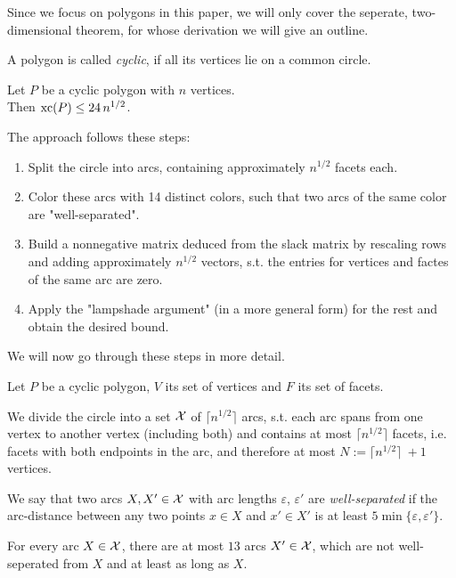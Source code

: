Since we focus on polygons in this paper, we will only cover the seperate, two-dimensional theorem, for whose derivation we will give an outline.

\begin{definition}
  A polygon is called \emph{cyclic}, if all its vertices lie on a common circle.
\end{definition}

\begin{theorem}
  Let $P$ be a cyclic polygon with $n$ vertices.\\
  Then $\operatorname{xc}(P) \leq 24\,n^{1/2}$.
\end{theorem}

The approach follows these steps:

\begin{enumerate}
  \item Split the circle into arcs, containing approximately $n^{1/2}$ facets each.
  \item Color these arcs with 14 distinct colors, such that two arcs of the same color are "well-separated".
  \item Build a nonnegative matrix deduced from the slack matrix by rescaling rows and adding approximately $n^{1/2}$ vectors, s.t. the entries for vertices and factes of the same arc are zero.
  \item Apply the "lampshade argument" (in a more general form) for the rest and obtain the desired bound.
\end{enumerate}

We will now go through these steps in more detail.

Let $P$ be a cyclic polygon, $V$ its set of vertices and $F$ its set of facets.

We divide the circle into a set $\mathcal{X}$ of $\lceil n^{1/2} \rceil$ arcs, s.t. each arc spans from one vertex to another vertex (including both) and contains at most $\lceil n^{1/2} \rceil$ facets, i.e. facets with both endpoints in the arc, and therefore at most $N := \lceil n^{1/2} \rceil\ + 1$ vertices.

\begin{definition}
  We say that two arcs $X,X' \in \mathcal{X}$ with arc lengths $\varepsilon$, $\varepsilon'$ are \emph{well-separated} if the arc-distance between any two points $x \in X$ and $x' \in X'$ is at least $5 \min\{\varepsilon, \varepsilon'\}$.
\end{definition}

\begin{lemma}\label{lemma:arc-not-separated}
  For every arc $X \in \mathcal{X}$, there are at most $13$ arcs $X' \in \mathcal{X}$, which are not well-seperated from $X$ and at least as long as $X$.
\end{lemma}

